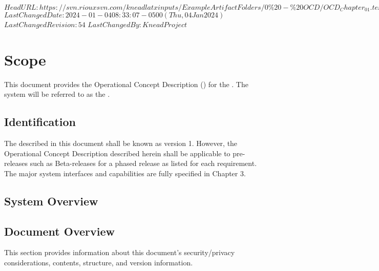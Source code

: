 \svnidlong
{$HeadURL: https://svn.riouxsvn.com/kneadlatxinputs/ExampleArtifactFolders/0\%20-\%20OCD/OCD_Chapter_01.tex $}
{$LastChangedDate: 2024-01-04 08:33:07 -0500 (Thu, 04 Jan 2024) $}
{$LastChangedRevision: 54 $}
{$LastChangedBy: KneadProject $}

\chapter{Scope}
\label{chap:Scope}
% 

This document provides the Operational Concept Description (\OCD) for the \ThisSystem.
The system will be referred to as the \ThisSys.

\section{Identification}
\label{sec:Identification}
% 

The \ThisSystem described in this document shall be known as \ThisSys version 1.
However, the Operational Concept Description {\OCD} described herein shall be applicable to pre-releases such as Beta-releases for a phased release as listed for each requirement.
The major system interfaces and capabilities are fully specified in Chapter 3.

\section{System Overview}
\label{sec:SystemOverview}
% 






\newpage
\section{Document Overview}
\label{sec:DocumentOverview}
% 

This section provides information about this document's security/privacy considerations, contents, structure, and version information.

% 



% 
